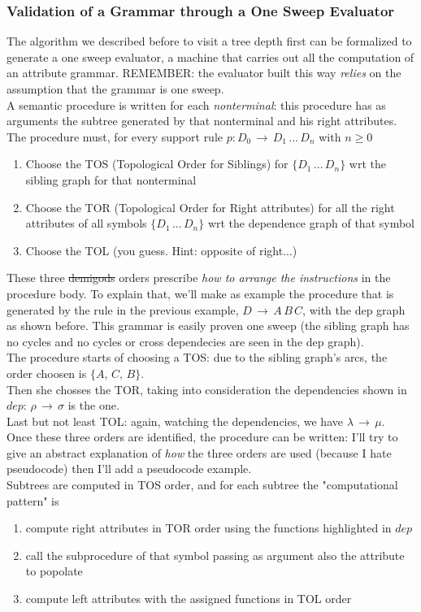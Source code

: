 \documentclass[10pt,a4paper]{article}
\begin{document}
				\subsubsection{Validation of a Grammar through a One Sweep Evaluator}
					The algorithm we described before to visit a tree depth first can be formalized to generate a one sweep evaluator, a machine that carries out all the computation of an attribute grammar. REMEMBER: the evaluator built this way \emph{relies} on the assumption that the grammar is one sweep.\\
					A semantic procedure is written for each \emph{nonterminal}: this procedure has as arguments the subtree generated by that nonterminal and his right attributes. The procedure must, for every support rule $p: D_0 \,\rightarrow\, D_1\,...\,D_n$ with $n \geq 0$
					\begin{enumerate}
						\item Choose the TOS (Topological Order for Siblings) for $\{D_1\,...\,D_n\}$ wrt the sibling graph for that nonterminal
						\item Choose the TOR (Topological Order for Right attributes) for all the right attributes of all symbols $\{D_1\,...\,D_n\}$ wrt the dependence graph of that symbol
						\item Choose the TOL (you guess. Hint: opposite of right...)
					\end{enumerate}
					These three \st{demigods} orders prescribe \emph{how to arrange the instructions} in the procedure body. To explain that, we'll make as example the procedure that is generated by the rule in the previous example, $D \,\rightarrow\, A\,B\,C$, with the dep graph as shown before. This grammar is easily proven one sweep (the sibling graph has no cycles and no cycles or cross dependecies are seen in the dep graph).\\
					The procedure starts of choosing a TOS: due to the sibling graph's arcs, the order choosen is $\{A,\,C,\,B\}$.\\
					Then she chosses the TOR, taking into consideration the dependencies shown in $dep$: $\rho\,\rightarrow\,\sigma$ is the one.\\
					Last but not least TOL: again, watching the dependencies, we have $\lambda\,\rightarrow\,\mu$.\\
					Once these three orders are identified, the procedure can be written: I'll try to give an abstract explanation of \emph{how} the three orders are used (because I hate pseudocode) then I'll add a pseudocode example.\\
					Subtrees are computed in TOS order, and for each subtree the "computational pattern" is
					\begin{enumerate}
						\item compute right attributes in TOR order using the functions highlighted in $dep$
						\item call the subprocedure of that symbol passing as argument also the attribute to popolate
						\item compute left attributes with the assigned functions in TOL order
					\end{enumerate}
					
\end{document}
